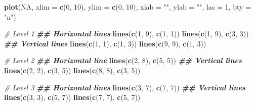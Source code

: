 \documentclass[
]{book}
\newenvironment{Shaded}{\begin{snugshade}}{\end{snugshade}}
\newcommand{\AttributeTok}[1]{\textcolor[rgb]{0.13,0.29,0.53}{#1}}
\newcommand{\CommentTok}[1]{\textcolor[rgb]{0.56,0.35,0.01}{\textit{#1}}}
\newcommand{\ConstantTok}[1]{\textcolor[rgb]{0.56,0.35,0.01}{#1}}
\newcommand{\DecValTok}[1]{\textcolor[rgb]{0.00,0.00,0.81}{#1}}
\newcommand{\DocumentationTok}[1]{\textcolor[rgb]{0.56,0.35,0.01}{\textbf{\textit{#1}}}}
\newcommand{\FunctionTok}[1]{\textcolor[rgb]{0.13,0.29,0.53}{\textbf{#1}}}
\newcommand{\NormalTok}[1]{#1}
\newcommand{\StringTok}[1]{\textcolor[rgb]{0.31,0.60,0.02}{#1}}
\begin{document}
\begin{Shaded}
\begin{Highlighting}[]
\FunctionTok{plot}\NormalTok{(}\ConstantTok{NA}\NormalTok{, }\AttributeTok{xlim =} \FunctionTok{c}\NormalTok{(}\DecValTok{0}\NormalTok{, }\DecValTok{10}\NormalTok{), }\AttributeTok{ylim =} \FunctionTok{c}\NormalTok{(}\DecValTok{0}\NormalTok{, }\DecValTok{10}\NormalTok{), }\AttributeTok{xlab =} \StringTok{""}\NormalTok{, }\AttributeTok{ylab =} \StringTok{""}\NormalTok{, }\AttributeTok{las =} \DecValTok{1}\NormalTok{, }\AttributeTok{bty =} \StringTok{"n"}\NormalTok{)}

\CommentTok{\# Level 1}
\DocumentationTok{\#\# Horizontal lines}
\FunctionTok{lines}\NormalTok{(}\FunctionTok{c}\NormalTok{(}\DecValTok{1}\NormalTok{, }\DecValTok{9}\NormalTok{), }\FunctionTok{c}\NormalTok{(}\DecValTok{1}\NormalTok{, }\DecValTok{1}\NormalTok{))}
\FunctionTok{lines}\NormalTok{(}\FunctionTok{c}\NormalTok{(}\DecValTok{1}\NormalTok{, }\DecValTok{9}\NormalTok{), }\FunctionTok{c}\NormalTok{(}\DecValTok{3}\NormalTok{, }\DecValTok{3}\NormalTok{))}
\DocumentationTok{\#\# Vertical lines}
\FunctionTok{lines}\NormalTok{(}\FunctionTok{c}\NormalTok{(}\DecValTok{1}\NormalTok{, }\DecValTok{1}\NormalTok{), }\FunctionTok{c}\NormalTok{(}\DecValTok{1}\NormalTok{, }\DecValTok{3}\NormalTok{))}
\FunctionTok{lines}\NormalTok{(}\FunctionTok{c}\NormalTok{(}\DecValTok{9}\NormalTok{, }\DecValTok{9}\NormalTok{), }\FunctionTok{c}\NormalTok{(}\DecValTok{1}\NormalTok{, }\DecValTok{3}\NormalTok{))}

\CommentTok{\# Level 2}
\DocumentationTok{\#\# Horizontal line}
\FunctionTok{lines}\NormalTok{(}\FunctionTok{c}\NormalTok{(}\DecValTok{2}\NormalTok{, }\DecValTok{8}\NormalTok{), }\FunctionTok{c}\NormalTok{(}\DecValTok{5}\NormalTok{, }\DecValTok{5}\NormalTok{))}
\DocumentationTok{\#\# Vertical lines}
\FunctionTok{lines}\NormalTok{(}\FunctionTok{c}\NormalTok{(}\DecValTok{2}\NormalTok{, }\DecValTok{2}\NormalTok{), }\FunctionTok{c}\NormalTok{(}\DecValTok{3}\NormalTok{, }\DecValTok{5}\NormalTok{))}
\FunctionTok{lines}\NormalTok{(}\FunctionTok{c}\NormalTok{(}\DecValTok{8}\NormalTok{, }\DecValTok{8}\NormalTok{), }\FunctionTok{c}\NormalTok{(}\DecValTok{3}\NormalTok{, }\DecValTok{5}\NormalTok{))}

\CommentTok{\# Level 3}
\DocumentationTok{\#\# Horizontal lines}
\FunctionTok{lines}\NormalTok{(}\FunctionTok{c}\NormalTok{(}\DecValTok{3}\NormalTok{, }\DecValTok{7}\NormalTok{), }\FunctionTok{c}\NormalTok{(}\DecValTok{7}\NormalTok{, }\DecValTok{7}\NormalTok{))}
\DocumentationTok{\#\# Vertical lines}
\FunctionTok{lines}\NormalTok{(}\FunctionTok{c}\NormalTok{(}\DecValTok{3}\NormalTok{, }\DecValTok{3}\NormalTok{), }\FunctionTok{c}\NormalTok{(}\DecValTok{5}\NormalTok{, }\DecValTok{7}\NormalTok{))}
\FunctionTok{lines}\NormalTok{(}\FunctionTok{c}\NormalTok{(}\DecValTok{7}\NormalTok{, }\DecValTok{7}\NormalTok{), }\FunctionTok{c}\NormalTok{(}\DecValTok{5}\NormalTok{, }\DecValTok{7}\NormalTok{))}


\end{Highlighting}
\end{Shaded}
\end{document}
